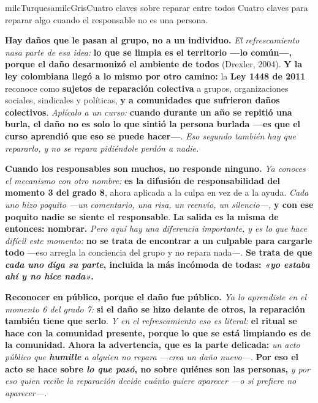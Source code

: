 \documentclass[11pt,letterpaper]{article}
\newcommand{\milcpaso}[3]{%
\Needspace{4\baselineskip}%
\begin{tcolorbox}[enhanced,colback=white,colframe=milcLinea,arc=1.5mm,boxrule=.9pt,
  left=14mm,right=4mm,top=3mm,bottom=3mm,before skip=4pt,after skip=4pt,
  fontupper=\RaggedRight,
  overlay={\node[anchor=north west,circle,fill=#2,text=white,inner sep=0pt,
    minimum size=7.4mm,font=\sffamily\bfseries\small]
    at ([xshift=3.6mm,yshift=-3.2mm]frame.north west) {#1};}]
#3
\end{tcolorbox}}
\begin{document}
\begin{softbox}{milcTurquesa}{milcGris}{Cuatro claves sobre reparar entre todos}
Cuatro claves para reparar algo cuando el responsable no es una persona.
\end{softbox}

\milcpaso{1}{milcTurquesa}{\textbf{Hay daños que le pasan al grupo, no a un individuo.} \emph{El refrescamiento nasa parte de esa idea:} \textbf{lo que se limpia es el territorio ---lo común---, porque el daño desarmonizó el ambiente de todos} (Drexler, 2004). \textbf{Y la ley colombiana llegó a lo mismo por otro camino:} la \textbf{Ley 1448 de 2011} reconoce como \textbf{sujetos de reparación colectiva} a grupos, organizaciones sociales, sindicales y políticas, \textbf{y a comunidades que sufrieron daños colectivos}. \emph{Aplícalo a un curso:} \textbf{cuando durante un año se repitió una burla, el daño no es solo lo que sintió la persona burlada ---es que el curso aprendió que eso se puede hacer---}. \emph{Eso segundo también hay que repararlo, y no se repara pidiéndole perdón a nadie.}}
\milcpaso{2}{milcTurquesa}{\textbf{Cuando los responsables son muchos, no responde ninguno.} \emph{Ya conoces el mecanismo con otro nombre:} \textbf{es la difusión de responsabilidad del momento 3 del grado 8}, ahora aplicada a la culpa en vez de a la ayuda. \emph{Cada uno hizo poquito ---un comentario, una risa, un reenvío, un silencio---,} \textbf{y con ese poquito nadie se siente el responsable}. \textbf{La salida es la misma de entonces: nombrar.} \emph{Pero aquí hay una diferencia importante, y es lo que hace difícil este momento:} \textbf{no se trata de encontrar a un culpable para cargarle todo} ---eso arregla la conciencia del grupo y no repara nada---. \textbf{Se trata de que \emph{cada uno diga su parte}, incluida la más incómoda de todas: \emph{«yo estaba ahí y no hice nada»}.}}
\milcpaso{3}{milcTurquesa}{\textbf{Reconocer en público, porque el daño fue público.} \emph{Ya lo aprendiste en el momento 6 del grado 7:} \textbf{si el daño se hizo delante de otros, la reparación también tiene que serlo}. \emph{Y en el refrescamiento eso es literal:} \textbf{el ritual se hace con la comunidad presente, porque lo que se está limpiando es de la comunidad.} \textbf{Ahora la advertencia, que es la parte delicada:} \emph{un acto público que \textbf{humille} a alguien no repara ---crea un daño nuevo---}. \textbf{Por eso el acto se hace sobre \emph{lo que pasó}, no sobre quiénes son las personas,} \emph{y por eso quien recibe la reparación decide cuánto quiere aparecer ---o si prefiere no aparecer---.}}
\end{document}
